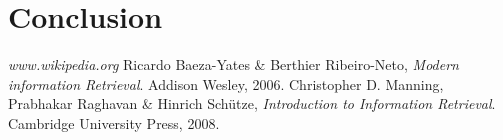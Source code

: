 \documentclass[letterpaper,11pt]{article}
\begin{document}
\section{Conclusion}



\begin{thebibliography}{9}
\emph{www.wikipedia.org}
  Ricardo Baeza-Yates \& Berthier Ribeiro-Neto,
   \emph{Modern information Retrieval}.
  Addison Wesley,
  2006.
  Christopher D. Manning, Prabhakar Raghavan \& Hinrich Schütze,
  \emph{Introduction to Information Retrieval}.
  Cambridge University Press,
  2008.



\end{thebibliography}

    
\end{document}
